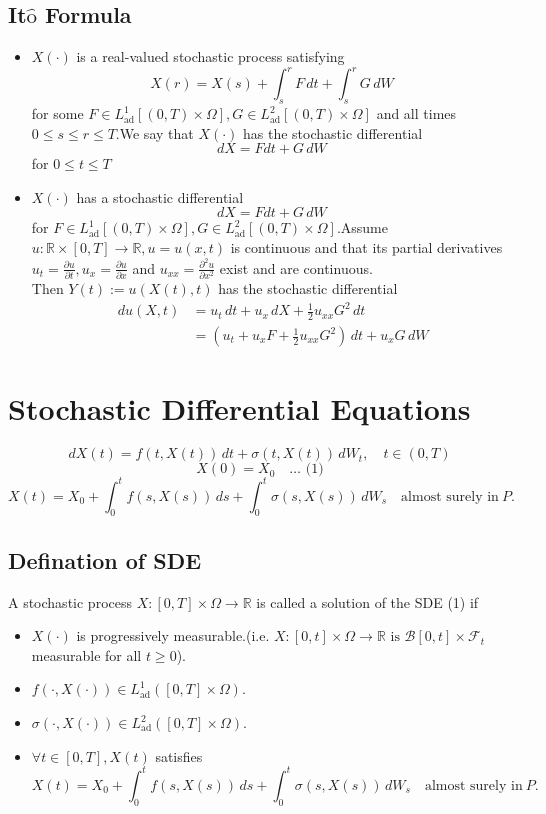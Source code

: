 \documentclass[twoside,final]{hcmut-report}
\begin{document}
 


\subsection{\texorpdfstring{It$\hat{\text{o}}$ Formula}{Ito Formula}}
\begin{itemize}
     \item $X(\cdot)$ is a real-valued stochastic process satisfying \[ X(r) = X(s) + \int_s^r F\,dt + \int_s^r G\,dW\] for some $F \in L^1_\text{ad}[(0,T)\times \Omega], G \in L^2_\text{ad}[(0,T)\times \Omega]$ and all times $0 \leq  s \leq r \leq T$.We say that $X(\cdot)$ has the stochastic differential 
     \[ dX = F dt + G\,dW\] for $0 \leq t \leq T$
     \item $X(\cdot)$ has a stochastic differential \[ dX = F dt + G\,dW\] for $F \in L^1_\text{ad}[(0,T)\times \Omega], G \in L^2_\text{ad}[(0,T)\times \Omega]$.Assume $u \colon \mathbb{R} \times [0,T] \rightarrow \mathbb{R}, u = u(x,t)$ is continuous and that its partial derivatives $u_t = \frac{\partial u}{\partial t}, u_x = \frac{\partial u}{\partial x}$ and $u_{xx} = \frac{\partial^2 u}{\partial x^2}$  exist and are continuous.\\
     Then $Y(t) := u(X(t),t)$ has the stochastic differential 
     \begin{align*}
         \,du(X,t) &= u_t\,dt + u_x\,dX + \frac{1}{2} u_{xx} G^2\,dt\\
         &= (u_t + u_x F + \frac{1}{2} u_{xx} G^2)\,dt + u_x G\,dW
     \end{align*}
 \end{itemize}


\newpage
\section{Stochastic Differential Equations}

 \[dX(t) = f(t,X(t))\,dt + \sigma(t,X(t))\,dW_t, \quad t \in (0,T) \]  \[X(0) = X_0 \quad  \dots \text{ (1)} \] 
    \[X(t) = X_0 + \int_0^t f(s,X(s))\,ds + \int_0^t \sigma(s,X(s))\,dW_s \quad \text{almost surely in} \ P.\]
\subsection{Defination of SDE}
  A stochastic process $X \colon [0,T] \times \Omega \rightarrow \mathbb{R}$ is called a solution of the SDE (1) if
    \begin{itemize}
        \item $X(\cdot)$ is progressively measurable.(i.e. $X \colon [0,t] \times \Omega \rightarrow \mathbb{R} \text{ is } \mathcal{B}[0,t]\times\mathcal{F}_t$ measurable for all $t \geq 0$).
        \item $f(\cdot,X(\cdot)) \in L_{\text{ad}}^1([0,T] \times \Omega)$.
        \item $\sigma(\cdot,X(\cdot)) \in L_{\text{ad}}^2([0,T] \times \Omega)$.
        \item $\forall t \in [0,T],X(t)$ satisfies
        \[X(t) = X_0 + \int_0^t f(s,X(s))\,ds + \int_0^t \sigma(s,X(s))\,dW_s \quad \text{almost surely in} \ P.\]
    \end{itemize}
\end{document}
